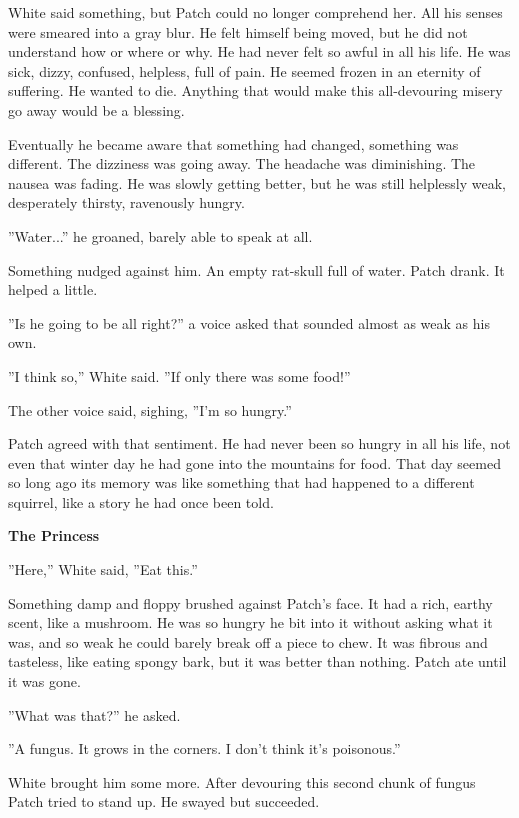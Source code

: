 \documentclass[11pt]{article}
\begin{document}
White said something, but Patch could no longer comprehend her. All his senses were smeared into a gray blur. He felt himself being moved, but he did not understand how or where or why. He had never felt so awful in all his life. He was sick, dizzy, confused, helpless, full of pain. He seemed frozen in an eternity of suffering. He wanted to die. Anything that would make this all-devouring misery go away would be a blessing.\par
Eventually he became aware that something had changed, something was different. The dizziness was going away. The headache was diminishing. The nausea was fading. He was slowly getting better, but he was still helplessly weak, desperately thirsty, ravenously hungry.\par
''Water...'' he groaned, barely able to speak at all.\par
Something nudged against him. An empty rat-skull full of water. Patch drank. It helped a little.\par
''Is he going to be all right?'' a voice asked that sounded almost as weak as his own.\par
''I think so,'' White said. ''If only there was some food!''\par
The other voice said, sighing, ''I'm so hungry.''\par
Patch agreed with that sentiment. He had never been so hungry in all his life, not even that winter day he had gone into the mountains for food. That day seemed so long ago its memory was like something that had happened to a different squirrel, like a story he had once been told.\par
\par
{\bf The Princess\par
}\par
 ''Here,'' White said, ''Eat this.''\par
 Something damp and floppy brushed against Patch's face. It had a rich, earthy scent, like a mushroom. He was so hungry he bit into it without asking what it was, and so weak he could barely break off a piece to chew. It was fibrous and tasteless, like eating spongy bark, but it was better than nothing. Patch ate until it was gone.\par
 ''What was that?'' he asked.\par
 ''A fungus. It grows in the corners. I don't think it's poisonous.''\par
 White brought him some more. After devouring this second chunk of fungus Patch tried to stand up. He swayed but succeeded.\par
\end{document}
